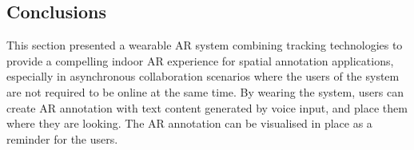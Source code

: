 \subsection{Conclusions}

This section presented a wearable AR system combining tracking technologies to provide a compelling indoor AR experience for spatial annotation applications, especially in asynchronous collaboration scenarios where the users of the system are not required to be online at the same time. By wearing the system, users can create AR annotation with text content generated by voice input, and place them where they are looking. The AR annotation can be visualised in place as a reminder for the users.  